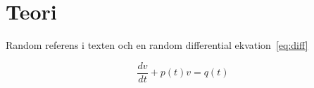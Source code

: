 \section{Teori}

Random referens \cite{HACKE:1} i texten och en random differential ekvation~\ref{eq:diff}

\begin{equation} \label{eq:diff}
	\dfrac{dv}{dt} + p(t)v = q(t)
\end{equation}
